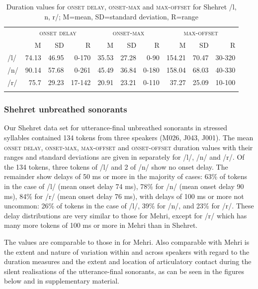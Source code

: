 \documentclass[output=paper]{langscibook}
\begin{document}
\begin{table}[p]
\caption{Duration values for \textsc{onset delay}, \textsc{onset-max} and \textsc{max-offset} for Shehret /l, n, r/; M=mean, SD=standard deviation, R=range}
\label{tab:watson:8}

\begin{tabularx}{\textwidth}{l@{~}rrrrrrrrr}
\lsptoprule
 & \multicolumn{3}{c}{\textsc{onset} \textsc{delay}} & \multicolumn{3}{c}{\textsc{onset-max}} & \multicolumn{3}{c}{\textsc{max-offset}}\\
 \cmidrule(lr){2-4}\cmidrule(lr){5-7}\cmidrule(lr){8-10}
& M & SD & R & M & SD & R & M & SD & R\\
\midrule
/l/ & 74.13 & 46.95 & 0-170 & 35.53 & 27.28 & 0-90 & 154.21 & 70.47 & 30-320\\
/n/ & 90.14 & 57.68 & 0-261 & 45.49 & 36.84 & 0-180 & 158.04 & 68.03 & 40-330\\
/r/ & 75.7 & 29.23 & 17-142 & 20.91 & 23.21 & 0-110 & 37.27 & 25.09 & 10-100\\
\lspbottomrule
\end{tabularx}
\end{table}

\subsubsection{Shehret unbreathed sonorants} %
\label{sec:watson:4.3.3}

Our Shehret data set for utterance-final unbreathed sonorants in stressed syllables contained 134 tokens from three speakers (M026, J043, J001). The mean \textsc{onset} \textsc{delay}, \textsc{onset-max}, \textsc{max-offset} and \textsc{onset-offset} duration values with their ranges and standard deviations are given in  separately for \mbox{/l/}, \mbox{/n/} and \mbox{/r/}. Of the 134 tokens, three tokens of \mbox{/l/} and 2 of \mbox{/n/} show no onset delay. The remainder show delays of 50 ms or more in the majority of cases: 63\% of tokens in the case of \mbox{/l/} (mean onset delay 74 ms), 78\% for \mbox{/n/} (mean onset delay 90 ms), 84\% for \mbox{/r/} (mean onset delay 76 ms), with delays of 100 ms or more not uncommon: 26\% of tokens in the case of \mbox{/l/}, 39\% for \mbox{/n/}, and 23\% for \mbox{/r/}. These delay distributions are very similar to those for Mehri, except for \mbox{/r/} which has many more tokens of 100 ms or more in Mehri than in Shehret.\largerpage

The values are comparable to those in  for Mehri. Also comparable with Mehri is the extent and nature of variation within and across speakers with regard to the duration measures and the extent and location of articulatory contact during the silent realisations of the utterance-final sonorants, as can be seen in the figures below and in supplementary material.
\end{document}
